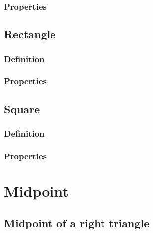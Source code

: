 \documentclass{article}
\begin{document}
\subsubsection{Properties}
\vspace{40px}
\subsection{Rectangle}
\subsubsection{Definition}
\vspace{40px}
\subsubsection{Properties}
\vspace{40px}

\subsection{Square}
\subsubsection{Definition}
\vspace{40px}
\subsubsection{Properties}
\vspace{40px}
\pagebreak

\section{Midpoint}
\subsection{Midpoint of a right triangle}



\end{document}
